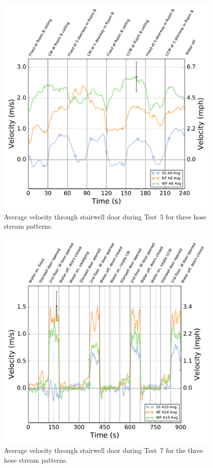 \documentclass[12pt,oneside]{book}
\begin{document}
\begin{figure}[!ht]
	\includegraphics[width=0.86\columnwidth]{../Figures/Plots/HOSE_IXAOXX_BDP_A6_stream_avgs}
	\caption{Average velocity through stairwell door during Test~5 for three hose stream patterns.}
	\label{fig:Test_5_BDP_A6_Avg_All}
\end{figure}
\FloatBarrier

\begin{figure}[!ht]
	\includegraphics[width=\columnwidth]{../Figures/Plots/Test_19_West_063014_BDP_A10_stream_avgs}
	\caption{Average velocity through stairwell door during Test~7 for the three hose stream patterns.}
	\label{fig:Test_7_BDP_A10_Avg_All}
\end{figure}

\clearpage
\end{document}
